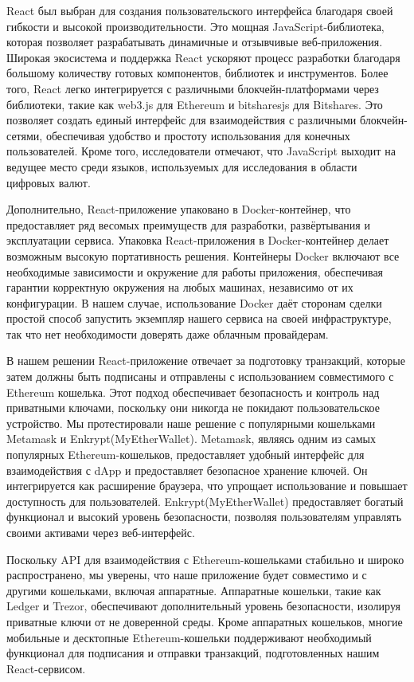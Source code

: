 React был выбран для создания пользовательского интерфейса благодаря своей гибкости и высокой производительности. Это мощная JavaScript-библиотека, которая позволяет разрабатывать динамичные и отзывчивые веб-приложения. Широкая экосистема и поддержка React ускоряют процесс разработки благодаря большому количеству готовых компонентов, библиотек и инструментов. Более того, React легко интегрируется с различными блокчейн-платформами через библиотеки, такие как web3.js для Ethereum и bitsharesjs для Bitshares. Это позволяет создать единый интерфейс для взаимодействия с различными блокчейн-сетями, обеспечивая удобство и простоту использования для конечных пользователей. Кроме того, исследователи отмечают, что JavaScript выходит на ведущее место среди языков, используемых для исследования в области цифровых валют\cite{label29}.

Дополнительно, React-приложение упаковано в Docker-контейнер, что предоставляет ряд весомых преимуществ для разработки, развёртывания и эксплуатации сервиса. Упаковка React-приложения в Docker-контейнер делает возможным высокую портативность решения. Контейнеры Docker включают все необходимые зависимости и окружение для работы приложения, обеспечивая гарантии корректную окружения на любых машинах, независимо от их конфигурации. В нашем случае, использование Docker даёт сторонам сделки простой способ запустить экземпляр нашего сервиса на своей инфраструктуре, так что нет необходимости доверять даже облачным провайдерам.

В нашем решении React-приложение отвечает за подготовку транзакций, которые затем должны быть подписаны и отправлены с использованием совместимого с Ethereum кошелька. Этот подход обеспечивает безопасность и контроль над приватными ключами, поскольку они никогда не покидают пользовательское устройство. Мы протестировали наше решение с популярными кошельками Metamask и Enkrypt(MyEtherWallet). Metamask, являясь одним из самых популярных Ethereum-кошельков, предоставляет удобный интерфейс для взаимодействия с dApp и предоставляет безопасное хранение ключей. Он интегрируется как расширение браузера, что упрощает использование и повышает доступность для пользователей. Enkrypt(MyEtherWallet) предоставляет богатый функционал и высокий уровень безопасности, позволяя пользователям управлять своими активами через веб-интерфейс.

Поскольку API для взаимодействия с Ethereum-кошельками стабильно и широко распространено, мы уверены, что наше приложение будет совместимо и с другими кошельками, включая аппаратные. Аппаратные кошельки, такие как Ledger и Trezor, обеспечивают дополнительный уровень безопасности, изолируя приватные ключи от не доверенной среды. Кроме аппаратных кошельков, многие мобильные и десктопные Ethereum-кошельки поддерживают необходимый функционал для подписания и отправки транзакций, подготовленных нашим React-сервисом.

